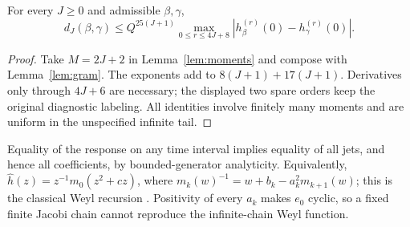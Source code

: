 \begin{theorem}
\label{thm:jet}
For every $J\ge0$ and admissible $\beta,\gamma$,
\begin{equation}
 d_J(\beta,\gamma)\le Q^{25(J+1)}
 \max_{0\le r\le4J+8}|h_\beta^{(r)}(0)-h_\gamma^{(r)}(0)|.
 \label{eq:jet}
\end{equation}
\end{theorem}
\begin{proof}
Take $M=2J+2$ in Lemma~\ref{lem:moments} and compose with
Lemma~\ref{lem:gram}. The exponents add to $8(J+1)+17(J+1)$.
Derivatives only through $4J+6$ are necessary; the displayed two spare orders
keep the original diagnostic labeling. All identities involve finitely many
moments and are uniform in the unspecified infinite tail.
\end{proof}

Equality of the response on any time interval implies equality of all jets,
and hence all coefficients, by bounded-generator analyticity. Equivalently,
$\widehat h(z)=z^{-1}m_0(z^2+cz)$, where
$m_k(w)^{-1}=w+b_k-a_k^2m_{k+1}(w)$; this is the classical Weyl recursion
\cite{Teschl}. Positivity of every $a_k$ makes $e_0$ cyclic, so a fixed finite
Jacobi chain cannot reproduce the infinite-chain Weyl function.

